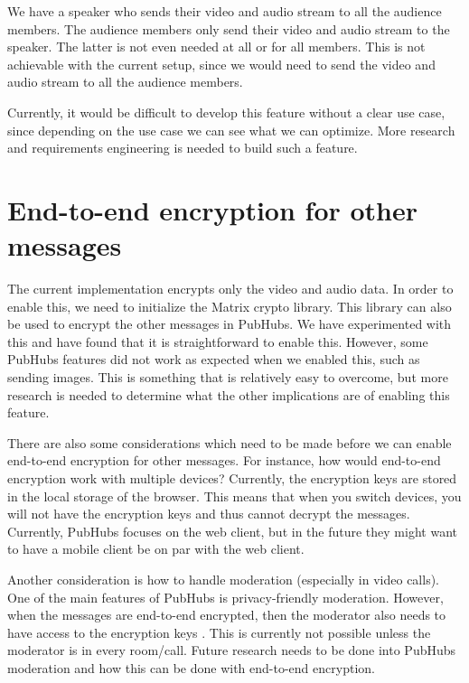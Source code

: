 \documentclass{report}
\begin{document}
We have a speaker who sends their video and audio stream to all the audience members. The audience members only send
their video and audio stream to the speaker. The latter is not even needed at all or for all members. This is not
achievable with the current setup, since we would need to send the video and audio stream to all the audience members.

Currently, it would be difficult to develop this feature without a clear use case, since depending on the use case we can
see what we can optimize. More research and requirements engineering is needed to build such a feature.

\section{End-to-end encryption for other messages}\label{sec:encryption_of_messages}
The current implementation encrypts only the video and audio data. In order to enable this, we need to initialize the
Matrix crypto library. This library can also be used to encrypt the other messages in PubHubs. We have experimented
with this and have found that it is straightforward to enable this. However, some PubHubs features did not work as expected
when we enabled this, such as sending images. This is something that is relatively easy to overcome, but more research is
needed to determine what the other implications are of enabling this feature.

There are also some considerations which need to be made before we can enable end-to-end encryption for other messages.
For instance, how would end-to-end encryption work with multiple devices? Currently, the encryption keys are stored in
the local storage of the browser. This means that when you switch devices, you will not have the encryption keys and
thus cannot decrypt the messages. Currently, PubHubs focuses on the web client, but in the future they might want to
have a mobile client be on par with the web client.

Another consideration is how to handle moderation (especially in video calls). One of the main features of PubHubs is
privacy-friendly moderation. However, when the messages are end-to-end encrypted, then the moderator also needs to have
access to the encryption keys \cite{noauthor_group_nodate}. This is currently not possible unless the moderator is in every
room/call. Future research needs to be done into PubHubs moderation and how this can be done with end-to-end encryption.

\newpage


\end{document}
